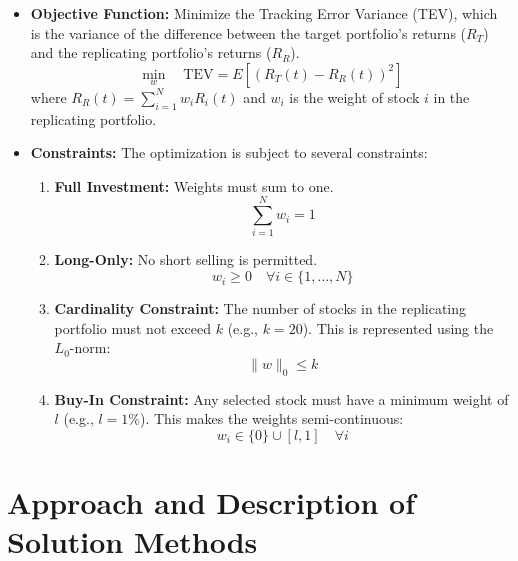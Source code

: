 \documentclass[12pt, a4paper]{article}
\begin{document}
	\begin{itemize}
		\item \textbf{Objective Function:} Minimize the Tracking Error Variance (TEV), which is the variance of the difference between the target portfolio's returns ($R_T$) and the replicating portfolio's returns ($R_R$).
		\begin{equation}
			\min_{w} \quad \text{TEV} = E\left[ \left( R_T(t) - R_R(t) \right)^2 \right]
		\end{equation}
		where $R_R(t) = \sum_{i=1}^{N} w_i R_i(t)$ and $w_i$ is the weight of stock $i$ in the replicating portfolio.
		
		\item \textbf{Constraints:} The optimization is subject to several constraints:
		\begin{enumerate}
			\item \textbf{Full Investment:} Weights must sum to one.
			\begin{equation}
				\sum_{i=1}^{N} w_i = 1
			\end{equation}
			\item \textbf{Long-Only:} No short selling is permitted.
			\begin{equation}
				w_i \ge 0 \quad \forall i \in \{1, \dots, N\}
			\end{equation}
			\item \textbf{Cardinality Constraint:} The number of stocks in the replicating portfolio must not exceed $k$ (e.g., $k=20$). This is represented using the $L_0$-norm:
			\begin{equation}
				\|w\|_0 \le k
			\end{equation}
			\item \textbf{Buy-In Constraint:} Any selected stock must have a minimum weight of $l$ (e.g., $l=1\%$). This makes the weights semi-continuous:
			\begin{equation}
				w_i \in \{0\} \cup [l, 1] \quad \forall i
			\end{equation}
		\end{enumerate}
	\end{itemize}
	
	\section{Approach and Description of Solution Methods}
	
\end{document}

